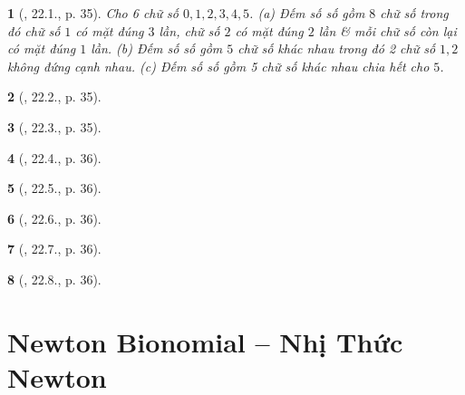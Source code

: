 \documentclass{article}
\newtheorem{baitoan}{}
\begin{document}
\begin{baitoan}[\cite{Hai_Hung_Thu_Tung_ncpt_Toan_10_tap_2}, 22.1., p. 35]
	Cho 6 chữ số $0,1,2,3,4,5$. (a) Đếm số số gồm $8$ chữ số trong đó chữ số $1$ có mặt đúng $3$ lần, chữ số $2$ có mặt đúng $2$ lần \& mỗi chữ số còn lại có mặt đúng $1$ lần. (b) Đếm số số gồm $5$ chữ số khác nhau trong đó 2 chữ số $1,2$ không đứng cạnh nhau. (c) Đếm số số gồm 5 chữ số khác nhau chia hết cho $5$.
\end{baitoan}

\begin{baitoan}[\cite{Hai_Hung_Thu_Tung_ncpt_Toan_10_tap_2}, 22.2., p. 35]
	
\end{baitoan}

\begin{baitoan}[\cite{Hai_Hung_Thu_Tung_ncpt_Toan_10_tap_2}, 22.3., p. 35]
	
\end{baitoan}

\begin{baitoan}[\cite{Hai_Hung_Thu_Tung_ncpt_Toan_10_tap_2}, 22.4., p. 36]
	
\end{baitoan}

\begin{baitoan}[\cite{Hai_Hung_Thu_Tung_ncpt_Toan_10_tap_2}, 22.5., p. 36]
	
\end{baitoan}

\begin{baitoan}[\cite{Hai_Hung_Thu_Tung_ncpt_Toan_10_tap_2}, 22.6., p. 36]
	
\end{baitoan}

\begin{baitoan}[\cite{Hai_Hung_Thu_Tung_ncpt_Toan_10_tap_2}, 22.7., p. 36]
	
\end{baitoan}

\begin{baitoan}[\cite{Hai_Hung_Thu_Tung_ncpt_Toan_10_tap_2}, 22.8., p. 36]
	
\end{baitoan}


\section{Newton Bionomial -- Nhị Thức Newton}
\end{document}
